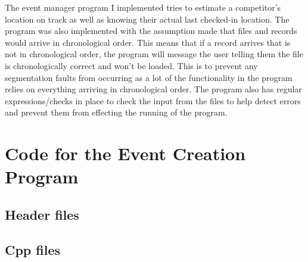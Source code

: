 \documentclass[a4paper,12pt]{article}
\begin{document}
\vspace{5mm}
\noindent The event manager program I implemented tries to estimate a competitor's location on track as well as knowing their actual last checked-in location. The program was also implemented with the assumption made that files and records would arrive in chronological order. This means that if a record arrives that is not in chronological order, the program will message the user telling them the file is chronologically correct and won't be loaded. This is to prevent any segmentation faults from occurring as a lot of the functionality in the program relies on everything arriving in chronological order. The program also has regular expressions/checks in place to check the input from the files to help detect errors and prevent them from effecting the running of the program. 

\newpage

\section{Code for the Event Creation Program}
\subsection{Header files}





\subsection{Cpp files}




\end{document}
